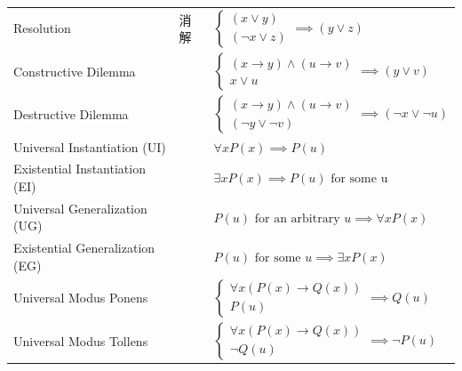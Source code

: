 \documentclass[12pt, a4paper, UTF8, openany]{ctexbook}
\begin{document}
\begin{longtable}[h]{l | l | l}
            Resolution & 消解 & 
            $\begin{cases}
                (x \lor y) \\ (\lnot x \lor z)
            \end{cases} \implies (y \lor z)$ \\
            \addlinespace

            Constructive Dilemma & &
            $\begin{cases}
                (x \to y) \land (u \to v) \\ x \lor u
            \end{cases} \implies (y \lor v)$ \\
            \addlinespace

            Destructive Dilemma & &
            $\begin{cases}
                (x \to y) \land (u \to v) \\ (\lnot y \lor \lnot v)
            \end{cases} \implies (\lnot x \lor \lnot u)$ \\
            \midrule

            Universal Instantiation (UI) & & $\forall xP(x) \implies P(u)$ \\
            \addlinespace
            Existential Instantiation (EI) & & $\exists xP(x) \implies P(u) \text{ for some u}$ \\
            \addlinespace
            Universal Generalization (UG) & & $P(u) \text{ for an arbitrary } u \implies \forall xP(x)$ \\
            \addlinespace
            Existential Generalization (EG) & & $P(u) \text{ for some } u \implies \exists xP(x)$ \\
            \midrule

            Universal Modus Ponens & & 
            $\begin{cases}
                \forall x(P(x) \to Q(x)) \\ P(u)
            \end{cases} \implies Q(u)$ \\
            \addlinespace

            Universal Modus Tollens & &
            $\begin{cases}
                \forall x(P(x) \to Q(x)) \\ \lnot Q(u)
            \end{cases} \implies \lnot P(u)$
        \end{longtable}
\end{document}
